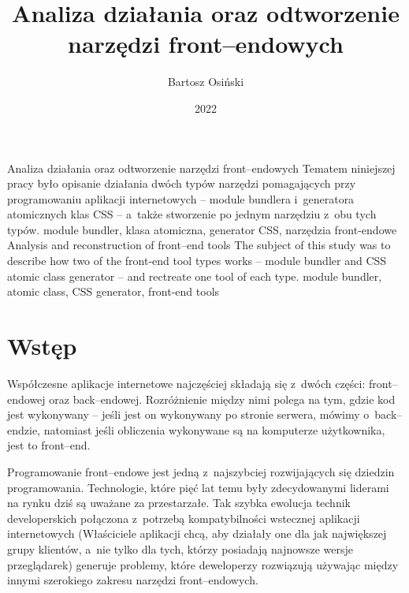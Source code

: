 \documentclass{SGGW-thesis}
\title{Analiza działania oraz odtworzenie narzędzi front--endowych}
\author{Bartosz Osiński}
\date{2022}
\begin{document}
\maketitle
\statementpage
\abstractpage
{Analiza działania oraz odtworzenie narzędzi front–endowych}
{Tematem niniejszej pracy było opisanie działania dwóch typów narzędzi pomagających przy programowaniu aplikacji internetowych -- module bundlera i~generatora atomicznych klas CSS -- a~także stworzenie po jednym narzędziu z~obu tych typów.}
{module bundler, klasa atomiczna, generator CSS, narzędzia front-endowe}
{Analysis and reconstruction of front--end tools}
{The subject of this study was to describe how two of the front-end tool types works -- module bundler and CSS atomic class generator -- and rectreate one tool of each type.}
{module bundler, atomic class, CSS generator, front-end tools}


\tableofcontents

\startchapterfromoddpage %


\chapter{Wstęp}
Współczesne aplikacje internetowe najczęściej składają się z~dwóch części: front--endowej oraz back--endowej. Rozróżnienie między nimi polega na tym, gdzie kod jest wykonywany -- jeśli jest on wykonywany po stronie serwera, mówimy o~back--endzie, natomiast jeśli obliczenia wykonywane są na komputerze użytkownika, jest to front--end.

Programowanie front--endowe jest jedną z~najszybciej rozwijających się dziedzin programowania. Technologie, które pięć lat temu były zdecydowanymi liderami na rynku dziś są uważane za przestarzałe. Tak szybka ewolucja technik developerskich połączona z~potrzebą kompatybilności wstecznej aplikacji internetowych (Właściciele aplikacji chcą, aby działały one dla jak największej grupy klientów, a~nie tylko dla tych, którzy posiadają najnowsze wersje przeglądarek) generuje problemy, które deweloperzy rozwiązują używając między innymi szerokiego zakresu narzędzi front--endowych.
\end{document}
